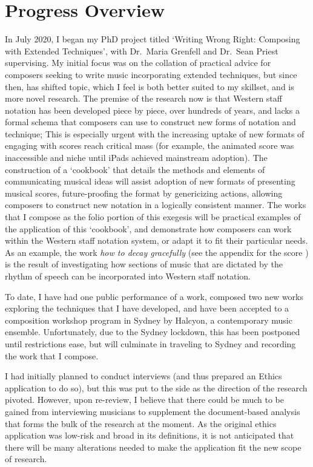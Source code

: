 \section{Progress Overview}
In July 2020, I began my PhD project titled `Writing Wrong Right: Composing with Extended Techniques', with Dr.\ Maria Grenfell and Dr.\ Sean Priest supervising.
My initial focus was on the collation of practical advice for composers seeking to write music incorporating extended techniques, but since then, has shifted topic, which I feel is both better suited to my skillset, and is more novel research.
The premise of the research now is that Western staff notation has been developed piece by piece, over hundreds of years, and lacks a formal schema that composers can use to construct new forms of notation and technique; 
This is especially urgent with the increasing uptake of new formats of engaging with scores reach critical mass (for example, the animated score was inaccessible and niche until iPads achieved mainstream adoption).
The construction of a `cookbook' that details the methods and elements of communicating musical ideas will assist adoption of new formats of presenting musical scores, future-proofing the format by genericizing actions, allowing composers to construct new notation in a logically consistent manner.
The works that I compose as the folio portion of this exegesis will be practical examples of the application of this `cookbook', and demonstrate how composers can work within the Western staff notation system, or adapt it to fit their particular needs.
As an example, the work \emph{how to decay gracefully} (see 
the appendix for the score
) is the result of investigating how sections of music that are dictated by the rhythm of speech can be incorporated into Western staff notation.

To date, I have had one public performance of a work, composed two new works exploring the techniques that I have developed, and have been accepted to a composition workshop program in Sydney by Halcyon, a contemporary music ensemble.
Unfortunately, due to the Sydney lockdown, this has been postponed until restrictions ease, but will culminate in traveling to Sydney and recording the work that I compose.

I had initially planned to conduct interviews (and thus prepared an Ethics application to do so), but this was put to the side as the direction of the research pivoted.
However, upon re-review, I believe that there could be much to be gained from interviewing musicians to supplement the document-based analysis that forms the bulk of the research at the moment. 
As the original ethics application was low-risk and broad in its definitions, it is not anticipated that there will be many alterations needed to make the application fit the new scope of research.

